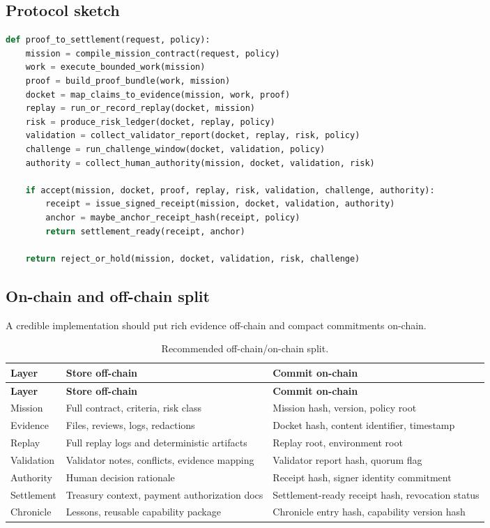 \documentclass[11pt]{article}
\newcommand{\onchain}{on-chain}
\newcommand{\offchain}{off-chain}
\begin{document}
\subsection{Protocol sketch}

\begin{lstlisting}[language=Python, caption={GoalOS proof-to-settlement protocol sketch.}]
def proof_to_settlement(request, policy):
    mission = compile_mission_contract(request, policy)
    work = execute_bounded_work(mission)
    proof = build_proof_bundle(work, mission)
    docket = map_claims_to_evidence(mission, work, proof)
    replay = run_or_record_replay(docket, mission)
    risk = produce_risk_ledger(docket, replay, policy)
    validation = collect_validator_report(docket, replay, risk, policy)
    challenge = run_challenge_window(docket, validation, policy)
    authority = collect_human_authority(mission, docket, validation, risk)

    if accept(mission, docket, proof, replay, risk, validation, challenge, authority):
        receipt = issue_signed_receipt(mission, docket, validation, authority)
        anchor = maybe_anchor_receipt_hash(receipt, policy)
        return settlement_ready(receipt, anchor)

    return reject_or_hold(mission, docket, validation, risk, challenge)
\end{lstlisting}

\subsection{On-chain and off-chain split}

A credible implementation should put rich evidence \offchain{} and compact commitments \onchain{}.

\begin{longtable}{p{} p{} p{}}
\caption{Recommended off-chain/on-chain split.}\label{tab:split}\\
\toprule
\textbf{Layer} & \textbf{Store off-chain} & \textbf{Commit on-chain}\\
\midrule
\endfirsthead
\toprule
\textbf{Layer} & \textbf{Store off-chain} & \textbf{Commit on-chain}\\
\midrule
\endhead
Mission & Full contract, criteria, risk class & Mission hash, version, policy root \\
Evidence & Files, reviews, logs, redactions & Docket hash, content identifier, timestamp \\
Replay & Full replay logs and deterministic artifacts & Replay root, environment root \\
Validation & Validator notes, conflicts, evidence mapping & Validator report hash, quorum flag \\
Authority & Human decision rationale & Receipt hash, signer identity commitment \\
Settlement & Treasury context, payment authorization docs & Settlement-ready receipt hash, revocation status \\
Chronicle & Lessons, reusable capability package & Chronicle entry hash, capability version hash \\
\bottomrule
\end{longtable}
\end{document}
